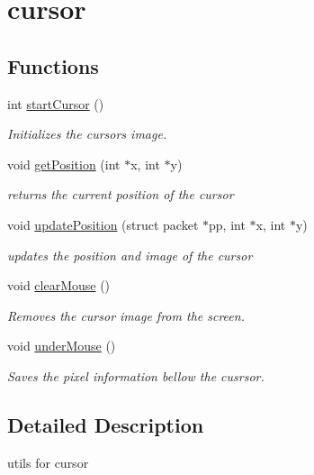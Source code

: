 \hypertarget{group__cursor}{}\section{cursor}
\label{group__cursor}
\subsection*{Functions}
\begin{DoxyCompactItemize}
\item 
int \mbox{\hyperlink{group__cursor_ga832ef8a00055d81e9bbba145f018eefe}{start\+Cursor}} ()
\begin{DoxyCompactList}\small\item\em Initializes the cursors image. \end{DoxyCompactList}\item 
void \mbox{\hyperlink{group__cursor_gac47a960acd2af3996c2b28d8150dcd8c}{get\+Position}} (int $\ast$x, int $\ast$y)
\begin{DoxyCompactList}\small\item\em returns the current position of the cursor \end{DoxyCompactList}\item 
void \mbox{\hyperlink{group__cursor_gaeeb5e132ce880a8269b3bd40c748b534}{update\+Position}} (struct packet $\ast$pp, int $\ast$x, int $\ast$y)
\begin{DoxyCompactList}\small\item\em updates the position and image of the cursor \end{DoxyCompactList}\item 
void \mbox{\hyperlink{group__cursor_gaf48e820503f0becc55d9eb740bffe3e8}{clear\+Mouse}} ()
\begin{DoxyCompactList}\small\item\em Removes the cursor image from the screen. \end{DoxyCompactList}\item 
void \mbox{\hyperlink{group__cursor_ga10ade0aba9d682a7f9fa64c65ef3a8e3}{under\+Mouse}} ()
\begin{DoxyCompactList}\small\item\em Saves the pixel information bellow the cusrsor. \end{DoxyCompactList}\end{DoxyCompactItemize}


\subsection{Detailed Description}
utils for cursor 

